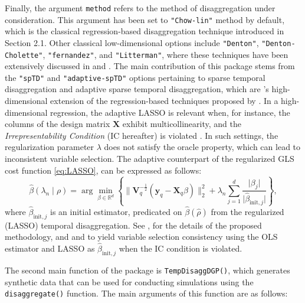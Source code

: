 Finally, the argument \texttt{method} refers to the method of disaggregation under consideration. This argument has been set to \texttt{"Chow-lin"} method by default, which is the classical regression-based disaggregation technique introduced in Section \protect\hypertarget{Classical-regression-based-techniques}{}{2.1}. Other classical low-dimensional options include \texttt{"Denton"}, \texttt{"Denton-Cholette"}, \texttt{"fernandez"}, and \texttt{"Litterman"}, where these techniques have been extensively discussed in \citet{dagum2006benchmarking} and \citet{sax2013temporal2}. The main contribution of this package stems from the \texttt{"spTD"} and \texttt{"adaptive-spTD"} options pertaining to sparse temporal disaggregation and adaptive sparse temporal disaggregation, which are \citet{10-1111rssa-12952}'s high-dimensional extension of the regression-based techniques proposed by \citet{chow1971best}. In a high-dimensional regression, the adaptive LASSO is relevant when, for instance, the columns of the design matrix \(\mathbf{X}\) exhibit multicollinearity, and the \emph{Irrepresentability Condition} (IC hereafter) is violated \citep[see][ for details]{zou2006adaptive}. In such settings, the regularization parameter \(\lambda\) does not satisfy the oracle property, which can lead to inconsistent variable selection. The adaptive counterpart of the regularized GLS cost function \eqref{eq:LASSO}, can be expressed as follows:
\begin{equation}
\hat{\beta}(\lambda_n\mid\rho)=\arg\min_{\beta\in\mathbb{R}^d}\left\{\Big\lVert \mathbf{V}_q^{-\frac{1}{2}}(\mathbf{y}_q-\mathbf{X}_q\beta)\Big\rVert_2^2+\lambda_n\sum_{j=1}^{d}\frac{\lvert \beta_j\rvert}{\lvert \hat{\beta}_{\text{init},j}\rvert}\right\},
\label{eq:AdaptiveLASSO}
\end{equation}
where \(\hat{\beta}_{\text{init},j}\) is an initial estimator, predicated on \(\hat{\beta}(\hat{\rho})\) from the regularized (LASSO) temporal disaggregation. See \citet{10-1111rssa-12952}, for the details of the proposed methodology, and \citet{zou2006adaptive} and \citet{van2011adaptive} to yield variable selection consistency using the OLS estimator and LASSO as \(\hat{\beta}_{\text{init},j}\) when the IC condition is violated.

The second main function of the  package is \texttt{TempDisaggDGP()}, which generates synthetic data that can be used for conducting simulations using the \texttt{disaggregate()} function. The main arguments of this function are as follows:

